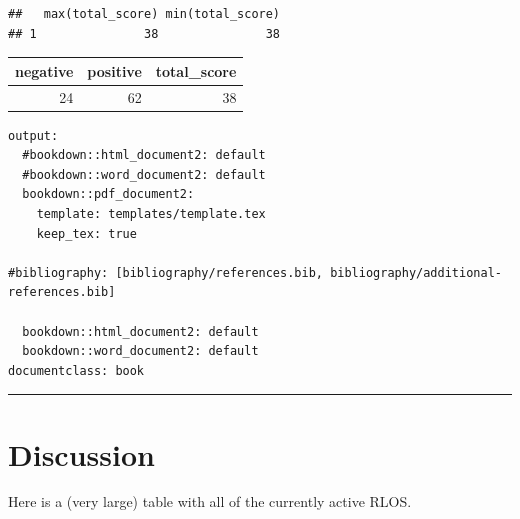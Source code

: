 \documentclass[a4paper, nobind]{templates/ociamthesis}
\begin{document}
\begin{verbatim}
##   max(total_score) min(total_score)
## 1               38               38
\end{verbatim}

\begin{tabular}{r|r|r}
\hline
negative & positive & total\_score\\
\hline
24 & 62 & 38\\
\hline
\end{tabular}

\begin{verbatim}
output:
  #bookdown::html_document2: default
  #bookdown::word_document2: default
  bookdown::pdf_document2:
    template: templates/template.tex
    keep_tex: true

#bibliography: [bibliography/references.bib, bibliography/additional-references.bib]

  bookdown::html_document2: default
  bookdown::word_document2: default
documentclass: book
\end{verbatim}

\begin{center}\rule{0.5\linewidth}{0.5pt}\end{center}

\hypertarget{Discussion}{%
\chapter{Discussion}\label{Discussion}}

\minitoc 

Here is a (very large) table with all of the currently active RLOS.
\end{document}
